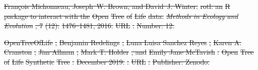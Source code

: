\documentclass[oupdraft]{sysbio_sse}
\providecommand{\DIFdel}[1]{{\protect\color{red}\sout{#1}}}                      %
\begin{document}
\DIFdel{François Michonneau, Joseph~W. Brown, and David~J. Winter.
}%
\DIFdel{rotl: an }%
\DIFdel{R}%
\DIFdel{package to interact with the }%
\DIFdel{Open}%
\DIFdel{Tree}%
\DIFdel{of }%
\DIFdel{Life}%
\DIFdel{data.
}%
\emph{\DIFdel{Methods in Ecology and Evolution}}%
\DIFdel{, 7}%
\DIFdel{(12):}%
\DIFdel{1476--1481, 2016.
}%
\DIFdel{URL
  }%
\DIFdel{.
}%
\DIFdel{Number: 12.
}%

\DIFdel{OpenTreeOfLife}%
\DIFdel{, }%
\DIFdel{Benjamin Redelings}%
\DIFdel{, }%
\DIFdel{Luna Luisa Sanchez Reyes}%
\DIFdel{, }%
\DIFdel{Karen A.
  Cranston}%
\DIFdel{, }%
\DIFdel{Jim Allman}%
\DIFdel{, }%
\DIFdel{Mark T. Holder}%
\DIFdel{, and }%
\DIFdel{Emily Jane McTavish}%
\DIFdel{.
}%
\DIFdel{Open }%
\DIFdel{Tree}%
\DIFdel{of }%
\DIFdel{Life}%
\DIFdel{Synthetic}%
\DIFdel{Tree}%
\DIFdel{.
}%
\DIFdel{December 2019.
}%
\DIFdel{.
}%
\DIFdel{URL }%
\DIFdel{.
}%
\DIFdel{Publisher: Zenodo.
}%
\end{document}
